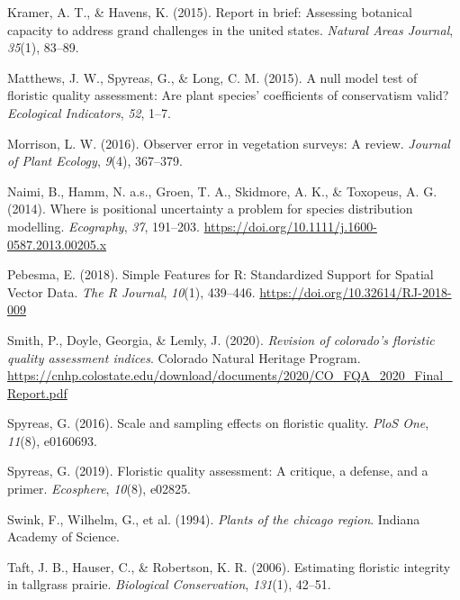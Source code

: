 \documentclass[
]{article}
\newlength{\cslhangindent}
\newlength{\cslentryspacingunit} %
\newenvironment{CSLReferences}[2] %
 {%
  \setlength{\parindent}{0pt}
  \ifodd #1
  \let\oldpar\par
  \def\par{\hangindent=\cslhangindent\oldpar}
  \fi
  \setlength{\parskip}{#2\cslentryspacingunit}
 }%
 {}
\begin{document}
\begin{CSLReferences}{1}{0}
\leavevmode{}%
Kramer, A. T., \& Havens, K. (2015). Report in brief: Assessing
botanical capacity to address grand challenges in the united states.
\emph{Natural Areas Journal}, \emph{35}(1), 83--89.

\leavevmode{}%
Matthews, J. W., Spyreas, G., \& Long, C. M. (2015). A null model test
of floristic quality assessment: Are plant species' coefficients of
conservatism valid? \emph{Ecological Indicators}, \emph{52}, 1--7.

\leavevmode{}%
Morrison, L. W. (2016). Observer error in vegetation surveys: A review.
\emph{Journal of Plant Ecology}, \emph{9}(4), 367--379.

\leavevmode{}%
Naimi, B., Hamm, N. a.s., Groen, T. A., Skidmore, A. K., \& Toxopeus, A.
G. (2014). Where is positional uncertainty a problem for species
distribution modelling. \emph{Ecography}, \emph{37}, 191--203.
\url{https://doi.org/10.1111/j.1600-0587.2013.00205.x}

\leavevmode{}%
Pebesma, E. (2018). {Simple Features for R: Standardized Support for
Spatial Vector Data}. \emph{{The R Journal}}, \emph{10}(1), 439--446.
\url{https://doi.org/10.32614/RJ-2018-009}

\leavevmode{}%
Smith, P., Doyle, Georgia, \& Lemly, J. (2020). \emph{Revision of
colorado's floristic quality assessment indices}. Colorado Natural
Heritage Program.
\url{https://cnhp.colostate.edu/download/documents/2020/CO_FQA_2020_Final_Report.pdf}

\leavevmode{}%
Spyreas, G. (2016). Scale and sampling effects on floristic quality.
\emph{PloS One}, \emph{11}(8), e0160693.

\leavevmode{}%
Spyreas, G. (2019). Floristic quality assessment: A critique, a defense,
and a primer. \emph{Ecosphere}, \emph{10}(8), e02825.

\leavevmode{}%
Swink, F., Wilhelm, G., et al. (1994). \emph{Plants of the chicago
region}. Indiana Academy of Science.

\leavevmode{}%
Taft, J. B., Hauser, C., \& Robertson, K. R. (2006). Estimating
floristic integrity in tallgrass prairie. \emph{Biological
Conservation}, \emph{131}(1), 42--51.

\end{CSLReferences}
\end{document}
